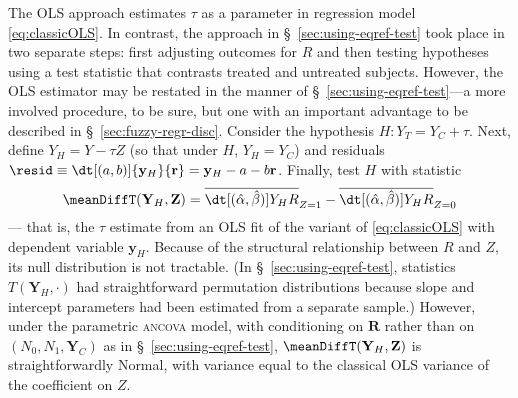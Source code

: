 The OLS approach estimates $\tau$ as a parameter in regression model
\eqref{eq:classicOLS}. In contrast, the approach in
\S~\ref{sec:using-eqref-test} took place in two separate steps:
first adjusting outcomes for $R$ and then testing hypotheses using a test
statistic that contrasts treated and untreated subjects.
However, the OLS estimator may be restated in the manner of
\S~\ref{sec:using-eqref-test}---a more involved procedure, to be sure,
but one with an important advantage to be described in \S~\ref{sec:fuzzy-regr-disc}.
Consider the hypothesis $H: Y_{T} = Y_{C} + \tau$.
Next, define ${{Y}_H} = {Y} - \tau {Z}$ (so that under $H$, $Y_H=Y_C$)
and residuals $\resid\equiv\dt[(a, b)]{\mathbf{y}_{H}}{ \mathbf{r}} = {\mathbf{y}_H} - a -
b\mathbf{r}$.
Finally, test $H$ with statistic
\begin{equation} \label{eq:MeanDiffTestStat}
\meanDiffT(\mathbf{Y}_H , \mathbf{Z}) =
\overline{\dt[(\hat{\alpha},\hat{\beta})]{{{Y}_H}}{ {R}}}_{Z=1} -
\overline{\dt[(\hat{\alpha},\hat{\beta})]{{{Y}_H}}{ {R}}}_{Z=0}
\end{equation}
--- that is, the $\tau$ estimate from an OLS fit of the variant of \eqref{eq:classicOLS}
with dependent variable $\mathbf{y}_{H}$.
Because of the structural relationship
between $R$ and $Z$, its null distribution
is not tractable. (In \S~\ref{sec:using-eqref-test}, statistics
$T(\mathbf{Y}_{H}, \cdot)$ had straightforward permutation distributions
because slope and intercept parameters had been estimated
from a separate sample.) However, under the parametric \textsc{ancova} model, with
conditioning on $\mathbf{R}$ rather than on $(N_{0}, N_{1},
\mathbf{Y}_{C})$ as in \S~\ref{sec:using-eqref-test},
$\meanDiffT(\mathbf{Y}_H , \mathbf{Z})$ is straightforwardly Normal, with
variance equal to the classical OLS variance of the coefficient on
$Z$.


